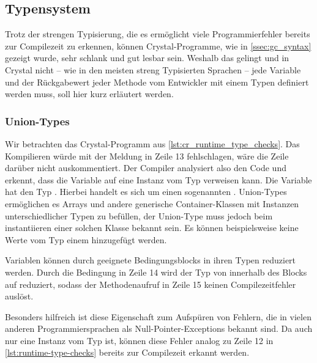 \subsection{Typensystem}
\label{ssec:gc_typensystem}

Trotz der strengen Typisierung, die es ermöglicht viele Programmierfehler
bereits zur Compilezeit zu erkennen, können Crystal-Programme, wie in
\cref{ssec:gc_syntax} gezeigt wurde, sehr schlank und gut lesbar sein.  Weshalb
das gelingt und in Crystal nicht -- wie in den meisten streng Typisierten
Sprachen -- jede Variable und der Rückgabewert jeder Methode vom Entwickler mit
einem Typen definiert werden muss, soll hier kurz erläutert werden.

\subsubsection{Union-Types}
\label{sssec:gct_union_types}

Wir betrachten das Crystal-Programm aus \cref{lst:cr_runtime_type_checks}.  Das
Kompilieren würde mit der Meldung in Zeile 13 fehlschlagen, wäre die Zeile
darüber nicht auskommentiert.  Der Compiler analysiert also den Code und
erkennt, dass die Variable  auf eine Instanz vom Typ 
verweisen kann.  Die Variable hat den Typ .  Hierbei handelt
es sich um einen sogenannten .  Union-Types
ermöglichen es Arrays und andere generische Container-Klassen mit Instanzen
unterschiedlicher Typen zu befüllen, der Union-Type muss jedoch beim
instantiieren einer solchen Klasse bekannt sein.  Es können beispielsweise
keine Werte vom Typ  einem  hinzugefügt
werden.

Variablen können durch geeignete Bedingungsblocks in ihren Typen reduziert
werden.  Durch die Bedingung in Zeile 14 wird der Typ von  innerhalb
des Blocks auf  reduziert, sodass der Methodenaufruf in
Zeile 15 keinen Compilezeitfehler auslöst.

Besonders hilfreich ist diese Eigenschaft zum Aufspüren von Fehlern, die in
vielen anderen Programmiersprachen als Null-Pointer-Exceptions bekannt sind.  Da
 auch nur eine Instanz vom Typ  ist, können diese Fehler
analog zu Zeile 12 in \cref{lst:runtime-type-checks} bereits zur Compilezeit erkannt
werden.



